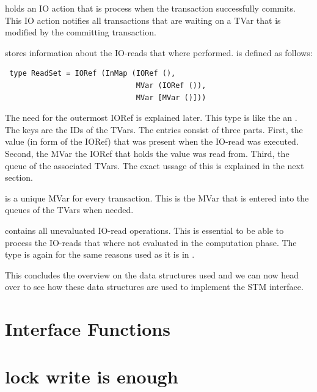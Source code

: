 holds an IO action that is process when the transaction successfully commits.
This IO action notifies all transactions that are waiting on a TVar that is modified by the 
committing transaction.

 stores information about the IO-reads that where performed. 
is defined as follows:
\begin{lstlisting}
 type ReadSet = IORef (InMap (IORef (), 
                              MVar (IORef ()), 
                              MVar [MVar ()]))
\end{lstlisting}
The need for the outermost IORef is explained later. This type is like the  an 
. The keys are the IDs of the TVars. The entries consist of three parts. First,
the value (in form of the IORef) that was present when the IO-read was executed. Second, the 
MVar the IORef that holds the value was read from. Third, the queue of the associated TVars.
The exact ussage of this is explained in the next section.

 is a unique MVar for every transaction. This is the MVar that is entered into
the queues of the TVars when needed.

 contains all unevaluated IO-read operations. This is essential to be able to 
process the IO-reads that where not evaluated in the computation phase. The  type
is again for the same reasons used as it is in .

This concludes the overview on the data structures used and we can now head over to see how these
data structures are used to implement the STM interface.





\section{Interface Functions}
\label{sec:IFFun}












\section{lock write is enough}

